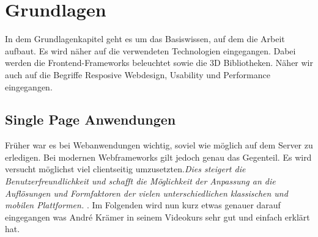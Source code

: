 %
%
%
\chapter{Grundlagen}
\label{cha:grundlagen}
%
%
In dem Grundlagenkapitel geht es um das Basiswissen, auf dem die Arbeit aufbaut. Es wird näher auf die verwendeten Technologien eingegangen. Dabei werden die Frontend-Frameworks beleuchtet sowie die 3D Bibliotheken. Näher wir auch auf die Begriffe Resposive Webdesign, Usability und Performance eingegangen.
%
%
%
%
%
\section{Single Page Anwendungen}
\label{sec:spa}
%
Früher war es bei Webanwendungen wichtig, soviel wie möglich auf dem Server zu erledigen. Bei modernen Webframeworks gilt jedoch genau das Gegenteil. Es wird versucht möglichst viel clientseitig umzusetzten.\textit{\glqq Dies steigert die Benutzerfreundlichkeit und schafft die Möglichkeit der Anpassung an die Auflösungen und Formfaktoren der vielen unterschiedlichen klassischen und mobilen Plattformen.\grqq } \cite{bahor_html5/webgl_2013}. Im Folgenden wird nun kurz etwas genauer darauf eingegangen was André Krämer in seinem Videokurs sehr gut und einfach erklärt hat.
%
